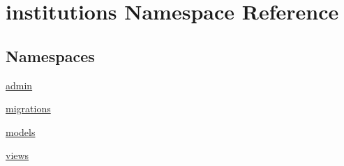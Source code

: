 \hypertarget{namespaceinstitutions}{\section{institutions Namespace Reference}
\label{namespaceinstitutions}
}
\subsection*{Namespaces}
\begin{DoxyCompactItemize}
\item 
\hyperlink{namespaceinstitutions_1_1admin}{admin}
\item 
\hyperlink{namespaceinstitutions_1_1migrations}{migrations}
\item 
\hyperlink{namespaceinstitutions_1_1models}{models}
\item 
\hyperlink{namespaceinstitutions_1_1views}{views}
\end{DoxyCompactItemize}

